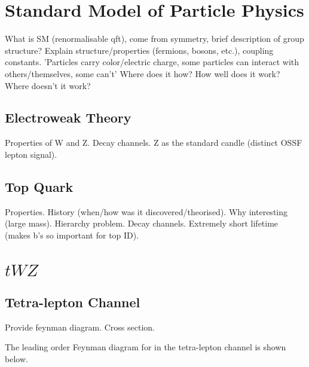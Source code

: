 \section{Standard Model of Particle Physics}
What is SM (renormalisable qft), come from symmetry, brief description of group structure? Explain structure/properties (fermions, bosons, etc.), coupling constants. 'Particles carry color/electric charge, some particles can interact with others/themselves, some can't' Where does it how? How well does it work? Where doesn't it work? 
\subsection{Electroweak Theory}
Properties of W and Z. Decay channels. Z as the standard candle (distinct OSSF lepton signal).
\subsection{Top Quark}
Properties. History (when/how was it discovered/theorised). Why interesting (large mass). Hierarchy problem. Decay channels. Extremely short lifetime (makes b's so important for top ID).
\section{$tWZ$}
\subsection{Tetra-lepton Channel}
Provide feynman diagram. Cross section. 

The leading order Feynman diagram for \tWZ in the tetra-lepton channel is shown below.




